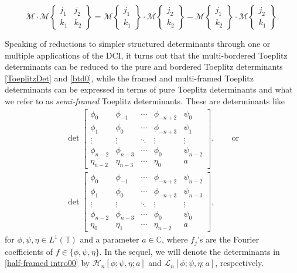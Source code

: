 \documentclass[10pt,a4paper]{amsart}
\numberwithin{equation}{section}
\newcommand{\C}{{\mathbb C}}
\newcommand{\T}{{\mathbb T}}
\begin{document}
\begin{equation}\label{DODGSON}
	\mathscr{M} \cdot \mathscr{M}\left\lbrace \begin{matrix} j_1 & j_2 \\ k_1& k_2 \end{matrix} \right\rbrace = \mathscr{M}\left\lbrace \begin{matrix} j_1 \\ k_1 \end{matrix} \right\rbrace \cdot \mathscr{M}\left\lbrace \begin{matrix} j_2 \\ k_2 \end{matrix} \right\rbrace - \mathscr{M}\left\lbrace \begin{matrix} j_1 \\ k_2 \end{matrix} \right\rbrace \cdot \mathscr{M}\left\lbrace \begin{matrix} j_2 \\ k_1 \end{matrix} \right\rbrace.
\end{equation}

Speaking of reductions to simpler structured determinants through one or multiple applications of the DCI, it turns out that the multi-bordered Toeplitz determinants can be reduced to the pure and bordered Toeplitz determinants \eqref{ToeplitzDet} and \eqref{btd0}, while the framed and multi-framed Toeplitz determinants can be expressed in terms of pure Toeplitz determinants and what we refer to as \textit{semi-framed} Toeplitz determinants. These are determinants like
\begin{gather}
	\det \begin{bmatrix}
		\phi_0& \phi_{-1} & \cdots & \phi_{-n+2} & \psi_{0} \\
		\phi_{1}& \phi_0 & \cdots & \phi_{-n+3} & \psi_{1} \\
		\vdots & \vdots & \ddots & \vdots & \vdots \\
		\phi_{n-2} & \phi_{n-3} & \cdots & \phi_{0} & \psi_{n-2} \\
		\eta_{n-2} & \eta_{n-3} & \cdots & \eta_{0} & a
	\end{bmatrix},\qquad \text{or}\nonumber\\
\det \begin{bmatrix}
		\phi_0& \phi_{-1} & \cdots & \phi_{-n+2} & \psi_{n-2} \\
		\phi_{1}& \phi_0 & \cdots & \phi_{-n+3} & \psi_{n-3} \\
		\vdots & \vdots & \ddots & \vdots & \vdots \\
		\phi_{n-2} & \phi_{n-3} & \cdots & \phi_{0} & \psi_{0} \\
		\eta_{0} & \eta_{1} & \cdots & \eta_{n-2} & a
	\end{bmatrix},\label{half-framed intro00}
\end{gather}
for $\phi,\psi,\eta \in L^1(\T)$ and a parameter $a \in \C$, where $f_j$'s are the Fourier coefficients of ${f \in \{ \phi, \psi, \eta \}}$. In the sequel, we will denote the determinants in \eqref{half-framed intro00} by $\mathscr{H}_n[\phi;\psi,\eta;a]$ and $\mathscr{L}_n[\phi;\psi,\eta;a]$, respectively.
\end{document}
